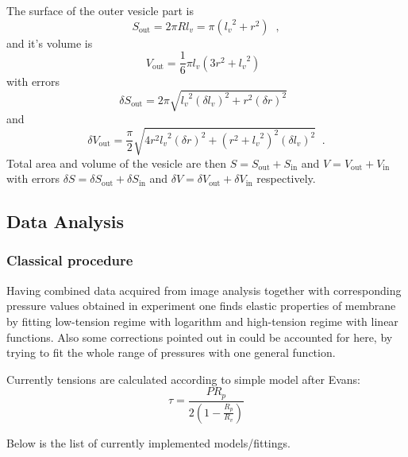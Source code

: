The surface of the outer vesicle part is
\begin{equation*}
S_\text{out} = 2\pi Rl_v = \pi \left({l_v}^2+r^2\right)\;\;,
\end{equation*}
and it's volume is
\begin{equation*}
V_\text{out} = \frac{1}{6}\pi l_v\left(3r^2+{l_v}^2\right)\;\;
\end{equation*}
with errors
\begin{equation*}
\delta S_\text{out} = 2\pi\sqrt{{l_v}^2 \left(\delta l_v\right)^2 + r^2 \left( \delta r\right) ^2}\;\;
\end{equation*}
and
\begin{equation*}
\delta V_\text{out} = \frac{\pi}{2} \sqrt{4 r^2 {l_v}^2\left(\delta r\right)^2 + \left(r^2+{l_v}^2\right)^2 \left(\delta l_v\right)^2}\;\;.
\end{equation*}
Total area and volume of the vesicle are then $S = S_\text{out}+S_\text{in}$ and $V = V_\text{out}+V_\text{in}$ with errors $\delta S = \delta S_\text{out} + \delta S_\text{in}$ and $\delta V = \delta V_\text{out} + \delta V_\text{in}$ respectively.

\subsection{Data Analysis}\label{analysis}
\subsubsection{Classical procedure}
Having combined data acquired from image analysis together with corresponding pressure values obtained in experiment one finds elastic properties of membrane by fitting low-tension regime with logarithm and high-tension regime with linear functions. Also some corrections pointed out in \cite{Henriksen2004, Fournier2001} could be accounted for here, by trying to fit the whole range of pressures with one general function.

Currently tensions are calculated according to simple model after Evans:
\begin{equation}
\tau = \frac{P R_p}{2\left(1-\frac{R_p}{R_v}\right)}
\label{eq:tau-evans}
\end{equation}

Below is the list of currently implemented models/fittings.


